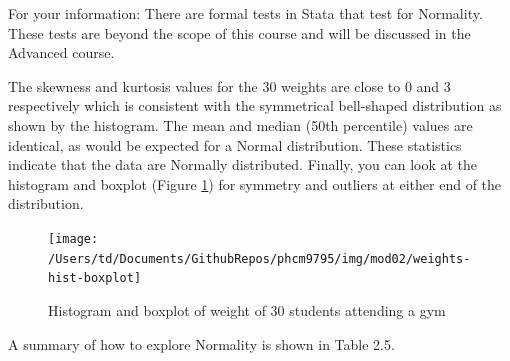 \documentclass[
]{memoir}
\begin{document}
For your information: There are formal tests in Stata that test for Normality. These tests are beyond the scope of this course and will be discussed in the Advanced course.

The skewness and kurtosis values for the 30 weights are close to 0 and 3 respectively which is consistent with the symmetrical bell-shaped distribution as shown by the histogram. The mean and median (50th percentile) values are identical, as would be expected for a Normal distribution. These statistics indicate that the data are Normally distributed. Finally, you can look at the histogram and boxplot (Figure \ref{fig:fig-2-6}) for symmetry and outliers at either end of the distribution.

\begin{figure}
\texttt{[image: /Users/td/Documents/GithubRepos/phcm9795/img/mod02/weights-hist-boxplot]} \caption{Histogram and boxplot of weight of 30 students attending a gym}\label{fig:fig-2-6}
\end{figure}

A summary of how to explore Normality is shown in Table 2.5.

 
  \providecommand{\huxb}[2]{\arrayrulecolor[RGB]{#1}\global\arrayrulewidth=#2pt}
  \providecommand{\huxvb}[2]{\color[RGB]{#1}\vrule width #2pt}
  \providecommand{\huxtpad}[1]{\rule{0pt}{#1}}
  \providecommand{\huxbpad}[1]{\rule[-#1]{0pt}{#1}}
\end{document}
